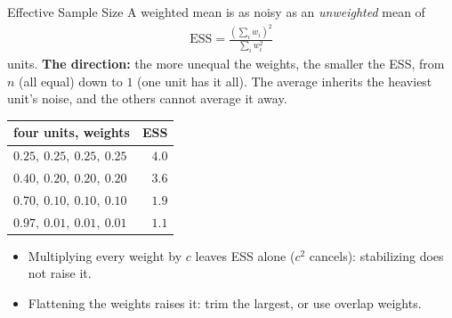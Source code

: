 \documentclass[aspectratio=169,11pt,xcolor=dvipsnames]{beamer}
\begin{document}
\begin{frame}{Effective Sample Size}
A weighted mean is as noisy as an \emph{unweighted} mean of
\begin{align*}
  \text{ESS} = \frac{(\sum_i w_i)^2}{\sum_i w_i^2}
\end{align*}
\vskip-4pt
units. \textbf{The direction:} the more unequal the weights, the smaller the
ESS, from $n$ (all equal) down to $1$ (one unit has it all). The average
inherits the heaviest unit's noise, and the others cannot average it away.
\vskip-2pt
\begin{center}\footnotesize
\renewcommand{\arraystretch}{1.0}
\begin{tabular}{lr}
\toprule
four units, weights & ESS \\
\midrule
$0.25,\ 0.25,\ 0.25,\ 0.25$ & $4.0$ \\
$0.40,\ 0.20,\ 0.20,\ 0.20$ & $3.6$ \\
$0.70,\ 0.10,\ 0.10,\ 0.10$ & $1.9$ \\
$0.97,\ 0.01,\ 0.01,\ 0.01$ & $1.1$ \\
\bottomrule
\end{tabular}
\end{center}
\vskip-4pt
\begin{itemize}\itemsep1pt
  \item Multiplying every weight by $c$ leaves ESS alone ($c^2$ cancels):
        stabilizing does not raise it.
  \item Flattening the weights raises it: trim the largest, or use overlap weights.
\end{itemize}
\end{frame}
\end{document}
